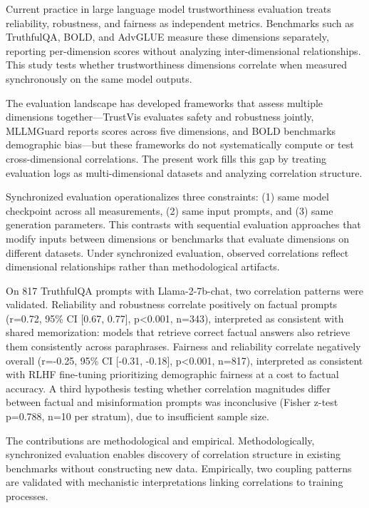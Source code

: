 
Current practice in large language model trustworthiness evaluation treats reliability, robustness, and fairness as independent metrics. Benchmarks such as TruthfulQA, BOLD, and AdvGLUE measure these dimensions separately, reporting per-dimension scores without analyzing inter-dimensional relationships. This study tests whether trustworthiness dimensions correlate when measured synchronously on the same model outputs.

The evaluation landscape has developed frameworks that assess multiple dimensions together---TrustVis evaluates safety and robustness jointly, MLLMGuard reports scores across five dimensions, and BOLD benchmarks demographic bias---but these frameworks do not systematically compute or test cross-dimensional correlations. The present work fills this gap by treating evaluation logs as multi-dimensional datasets and analyzing correlation structure.

Synchronized evaluation operationalizes three constraints: (1) same model checkpoint across all measurements, (2) same input prompts, and (3) same generation parameters. This contrasts with sequential evaluation approaches that modify inputs between dimensions or benchmarks that evaluate dimensions on different datasets. Under synchronized evaluation, observed correlations reflect dimensional relationships rather than methodological artifacts.

On 817 TruthfulQA prompts with Llama-2-7b-chat, two correlation patterns were validated. Reliability and robustness correlate positively on factual prompts (r=0.72, 95\% CI [0.67, 0.77], p<0.001, n=343), interpreted as consistent with shared memorization: models that retrieve correct factual answers also retrieve them consistently across paraphrases. Fairness and reliability correlate negatively overall (r=-0.25, 95\% CI [-0.31, -0.18], p<0.001, n=817), interpreted as consistent with RLHF fine-tuning prioritizing demographic fairness at a cost to factual accuracy. A third hypothesis testing whether correlation magnitudes differ between factual and misinformation prompts was inconclusive (Fisher z-test p=0.788, n=10 per stratum), due to insufficient sample size.

The contributions are methodological and empirical. Methodologically, synchronized evaluation enables discovery of correlation structure in existing benchmarks without constructing new data. Empirically, two coupling patterns are validated with mechanistic interpretations linking correlations to training processes.
